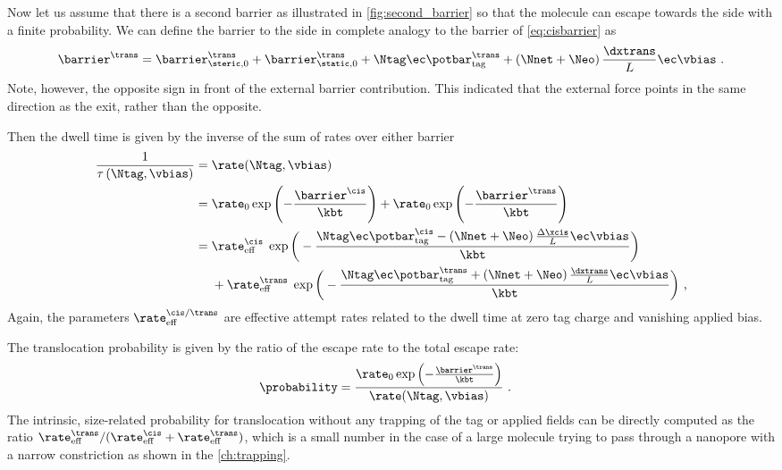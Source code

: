 Now let us assume that there is a second barrier as illustrated in \cref{fig:second_barrier} so that the
molecule can escape towards the \transi{} side with a finite probability. We can define the barrier to the
\transi{} side in complete analogy to the \cisi{} barrier of \cref{eq:cisbarrier} as
%
\begin{align*}
    \barrier^\trans = \barrier^{\trans}_{\steric,0}
        + \barrier^{\trans}_{\static,0}
        + \Ntag \ec  \potbar_{\rm{tag}}^\trans
        + \left(\Nnet + \Neo\right) \frac{\dxtrans}{L}\ec \vbias
        \text{ .}
\end{align*}
%
Note, however, the opposite sign in front of the external barrier contribution. This indicated that
the external force points in the same direction as the \transi{} exit, rather than the opposite.

Then the dwell time is given by the inverse of the sum of rates over either barrier
%
\begin{align}\label{eq:double_barrier_rate}
\begin{split}
    \frac{1}{\tau\left(\Ntag,\vbias\right)} ={}& \rate (\Ntag,\vbias)\\
    ={}&
     \rate_0\exp\left(-\frac{\barrier^\cis}{\kbt}\right)
     + \rate_0\exp\left(-\frac{\barrier^\trans}{\kbt}\right)\\
    ={}& \rate^{\cis}_{\rm{eff}}\; \exp\bigg(
        -\frac{\Ntag \ec  \potbar_{\rm{tag}}^\cis
        - \left(\Nnet + \Neo\right) \frac{\Delta \xcis}{L}\ec \vbias}{\kbt}
    \bigg)\\
    &+ \rate^{\trans}_{\rm{eff}}\; \exp\bigg(
        -\frac{\Ntag \ec  \potbar_{\rm{tag}}^\trans
        + \left(\Nnet + \Neo\right) \frac{\dxtrans}{L}\ec \vbias}{\kbt}
    \bigg)
    \text{ ,}
\end{split}
\end{align}
%
Again, the parameters $\rate^{\cis/\trans}_{\rm{eff}}$ are effective attempt rates related to the dwell time at
zero tag charge and vanishing applied bias.

The translocation probability is given by the ratio of the \transi{} escape rate to the total escape rate:
%
\begin{align*}
    \probability ={}& \frac{\rate_0\exp\left(-\frac{\barrier^\trans}{\kbt}\right)}{\rate (\Ntag, \vbias)}
    \text{ .}
\end{align*}
%
The intrinsic, size-related probability for translocation without any trapping of the tag or applied fields
can be directly computed as the ratio $\rate^{\trans}_{\rm{eff}}/(\rate^{\cis}_{\rm{eff}} +
\rate^{\trans}_{\rm eff})$, which is a small number in the case of a large molecule trying to pass through a
nanopore with a narrow \transi{} constriction as shown in the \cref{ch:trapping}.


